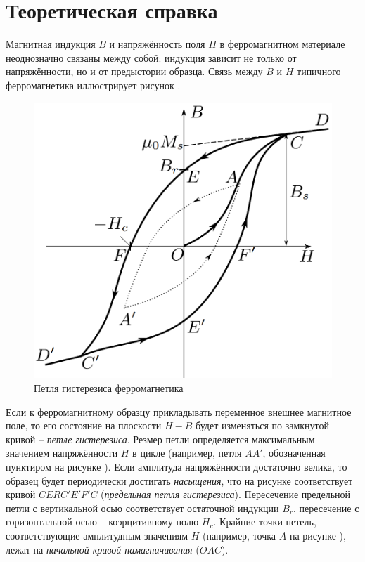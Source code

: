 \documentclass[a4paper, 12pt]{article}
\begin{document}
\section*{Теоретическая справка}

Магнитная индукция $B$ и напряжённость поля $H$ в ферромагнитном материале неоднозначно связаны между собой: индукция зависит не только от напряжённости, но и от предыстории образца. Связь между $B$ и $H$ типичного ферромагнетика иллюстрирует рисунок .

\begin{figure}[h]
	\centering
	\includegraphics[scale=0.45]{Theor}
	\caption{Петля гистерезиса ферромагнетика} \label{Theor}
\end{figure}

Если к ферромагнитному образцу прикладывать переменное внешнее магнитное поле, то его состояние на плоскости $H-B$ будет изменяться по замкнутой кривой -- \textit{петле гистерезиса}. Резмер петли определяется максимальным значением напряжённости $H$ в цикле (например, петля $AA'$, обозначенная пунктиром на рисунке ). Если амплитуда напряжённости достаточно велика, то образец будет периодически достигать \textit{насыщения}, что на рисунке соответствует кривой $CERC'E'F'C$ (\textit{предельная петля гистерезиса}). Пересечение предельной петли с вертикальной осью соответствует остаточной индукции $B_r$, пересечение с горизонтальной осью -- коэрцитивному полю $H_c$. Крайние точки петель, соответствующие амплитудным значениям $H$ (например, точка $A$ на рисунке ), лежат на \textit{начальной кривой намагничивания} ($OAC$).
\end{document}

